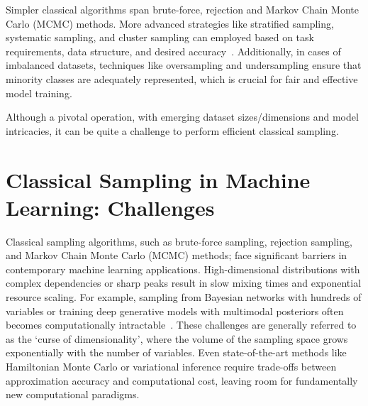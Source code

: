 \documentclass[encoding=utf8,british]{tumphthesis}
\begin{document}
        Simpler classical algorithms span brute-force, rejection and Markov Chain Monte Carlo (MCMC) methods.
        More advanced strategies like stratified sampling, systematic sampling, and cluster sampling can employed based on task requirements, data structure, and desired accuracy~\cite{ani2021sampling}. 
        Additionally, in cases of imbalanced datasets, techniques like oversampling and undersampling ensure that minority classes are adequately represented, which is crucial for fair and effective model training.

        Although a pivotal operation, with emerging dataset sizes/dimensions and model intricacies, it can be quite a challenge to perform efficient classical sampling.
        
    \section*{Classical Sampling in Machine Learning: Challenges}
    \label{sect:Intro_Challanges}
        Classical sampling algorithms, such as brute-force sampling, rejection sampling, and Markov Chain Monte Carlo (MCMC) methods;
        face significant barriers in contemporary machine learning applications. High-dimensional distributions with 
        complex dependencies or sharp peaks result in slow mixing times and exponential resource 
        scaling. For example, sampling from Bayesian networks with hundreds of variables or training deep generative 
        models with multimodal posteriors often becomes computationally intractable~\cite{Suzuki_2022}. These challenges are generally referred 
        to as the `curse of dimensionality', where the volume of the sampling space grows exponentially with the number 
        of variables. Even state-of-the-art methods like Hamiltonian Monte Carlo or variational inference require 
        trade-offs between approximation accuracy and computational cost, leaving room for fundamentally new 
        computational paradigms.
\end{document}
